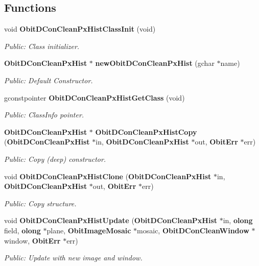 \subsection*{Functions}
\begin{CompactItemize}
\item 
void {\bf Obit\-DCon\-Clean\-Px\-Hist\-Class\-Init} (void)
\begin{CompactList}\small\item\em Public: Class initializer. \item\end{CompactList}\item 
{\bf Obit\-DCon\-Clean\-Px\-Hist} $\ast$ {\bf new\-Obit\-DCon\-Clean\-Px\-Hist} (gchar $\ast$name)
\begin{CompactList}\small\item\em Public: Default Constructor. \item\end{CompactList}\item 
gconstpointer {\bf Obit\-DCon\-Clean\-Px\-Hist\-Get\-Class} (void)
\begin{CompactList}\small\item\em Public: Class\-Info pointer. \item\end{CompactList}\item 
{\bf Obit\-DCon\-Clean\-Px\-Hist} $\ast$ {\bf Obit\-DCon\-Clean\-Px\-Hist\-Copy} ({\bf Obit\-DCon\-Clean\-Px\-Hist} $\ast$in, {\bf Obit\-DCon\-Clean\-Px\-Hist} $\ast$out, {\bf Obit\-Err} $\ast$err)
\begin{CompactList}\small\item\em Public: Copy (deep) constructor. \item\end{CompactList}\item 
void {\bf Obit\-DCon\-Clean\-Px\-Hist\-Clone} ({\bf Obit\-DCon\-Clean\-Px\-Hist} $\ast$in, {\bf Obit\-DCon\-Clean\-Px\-Hist} $\ast$out, {\bf Obit\-Err} $\ast$err)
\begin{CompactList}\small\item\em Public: Copy structure. \item\end{CompactList}\item 
void {\bf Obit\-DCon\-Clean\-Px\-Hist\-Update} ({\bf Obit\-DCon\-Clean\-Px\-Hist} $\ast$in, {\bf olong} field, {\bf olong} $\ast$plane, {\bf Obit\-Image\-Mosaic} $\ast$mosaic, {\bf Obit\-DCon\-Clean\-Window} $\ast$window, {\bf Obit\-Err} $\ast$err)
\begin{CompactList}\small\item\em Public: Update with new image and window. \item\end{CompactList}\item 

\end{CompactItemize}
